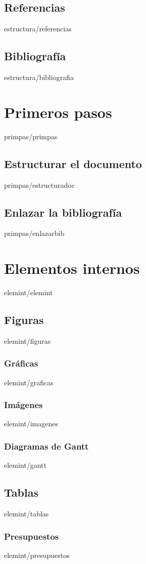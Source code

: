 \documentclass[epsbased,copyright,final,printable,covers,extendedindex,firstnumbered,tfg,gnuplot]{tfgtfmthesisuam}
\begin{document}
  \section{Referencias\label{SEC:REFERENCIAS}}{estructura/referencias}
  \section{Bibliografía\label{SEC:BIBLIOGRAFIA}}{estructura/bibliografia}

\chapter{Primeros pasos\label{CAP:PRIMEROSPASOS}}{primpas/primpas}
  \section{Estructurar el documento\label{SEC:ESTRUCTURAR}}{primpas/estructuradoc}
  \section{Enlazar la bibliografía\label{SEC:ENLAZBIBLIOGRAFIA}}{primpas/enlazarbib}

\chapter{Elementos internos\label{CAP:ELEMINT}}{elemint/elemint}
  \section{Figuras\label{SEC:FIGURAS}}{elemint/figuras}
    \subsection{Gráficas\label{SS:GRAFICAS}}{elemint/graficas}
    \subsection{Imágenes\label{SS:INMAGENES}}{elemint/imagenes}
    \subsection{Diagramas de Gantt\label{SS:GANTT}}{elemint/gantt}
  \section{Tablas\label{SEC:TABLAS}}{elemint/tablas}
    \subsection{Presupuestos\label{SS:PRESUPUESTOS}}{elemint/presupuestos}
\end{document}
